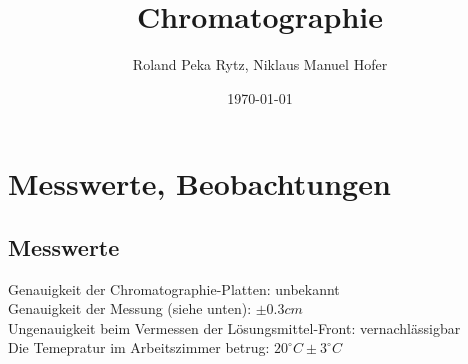 \documentclass[11pt,paper=a4,final]{scrartcl}
\title{Chromatographie}
\author{Roland Peka Rytz, Niklaus Manuel Hofer}
\date{\today{}}
\begin{document}
\maketitle

\section{Messwerte, Beobachtungen}
\subsection{Messwerte}
Genauigkeit der Chromatographie-Platten: unbekannt\\
Genauigkeit der Messung (siehe unten): \( \pm 0.3cm\) \\
Ungenauigkeit beim Vermessen der L\"osungsmittel-Front: vernachl\"assigbar \\
Die Temepratur im Arbeitszimmer betrug: \(20^\circ C \pm 3^\circ C\)
\end{document}
